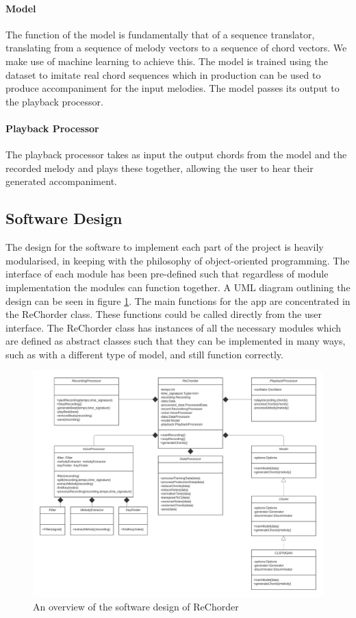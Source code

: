 \paragraph{Model}

The function of the model is fundamentally that of a sequence translator, translating from a sequence of melody vectors to a sequence of chord vectors.
We make use of machine learning to achieve this. 
The model is trained using the dataset to imitate real chord sequences which in production can be used to produce accompaniment for the input melodies.
The model passes its output to the playback processor.
\paragraph{Playback Processor}

The playback processor takes as input the output chords from the model and the recorded melody and plays these together, allowing the user to hear their generated accompaniment.
\subsection{Software Design}

The design for the software to implement each part of the project is heavily modularised, in keeping with the philosophy of object-oriented programming.
The interface of each module has been pre-defined such that regardless of module implementation the modules can function together. 
A UML diagram outlining the design can be seen in figure \ref{fig:SoftwareOverview}.
The main functions for the app are concentrated in the ReChorder class.
These functions could be called directly from the user interface.
The ReChorder class has instances of all the necessary modules which are defined as abstract classes such that they can be implemented in many ways, such as with a different type of model, and still function correctly.

\begin{figure}
    \centering
    \includegraphics[width=\columnwidth]{Figures/SoftwareOverview}
    \decoRule
    \caption[]{An overview of the software design of ReChorder}
    \label{fig:SoftwareOverview}
\end{figure}

